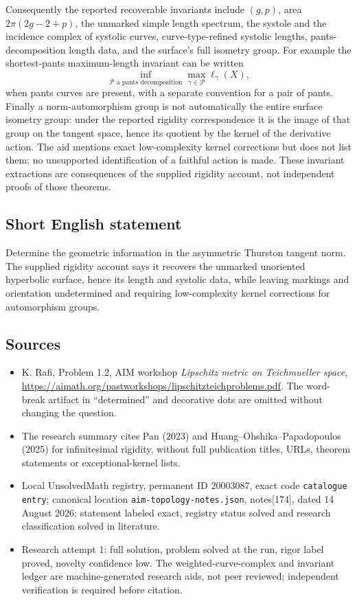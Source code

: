 \documentclass[11pt]{article}
\begin{document}
Consequently the reported recoverable invariants include \((g,p)\), area \(2\pi(2g-2+p)\), the unmarked simple length spectrum, the systole and the incidence complex of systolic curves, curve-type-refined systolic lengths, pants-decomposition length data, and the surface's full isometry group. For example the shortest-pants maximum-length invariant can be written
\[
\inf_{\mathcal P\text{ a pants decomposition}}\max_{\gamma\in\mathcal P}\ell_\gamma(X),
\]
when pants curves are present, with a separate convention for a pair of pants. Finally a norm-automorphism group is not automatically the entire surface isometry group: under the reported rigidity correspondence it is the image of that group on the tangent space, hence its quotient by the kernel of the derivative action. The aid mentions exact low-complexity kernel corrections but does not list them; no unsupported identification of a faithful action is made. These invariant extractions are consequences of the supplied rigidity account, not independent proofs of those theorems.
\subsection{Short English statement}
Determine the geometric information in the asymmetric Thurston tangent norm. The supplied rigidity account says it recovers the unmarked unoriented hyperbolic surface, hence its length and systolic data, while leaving markings and orientation undetermined and requiring low-complexity kernel corrections for automorphism groups.
\subsection{Sources}
\begin{itemize}
\item K. Rafi, Problem 1.2, AIM workshop \emph{Lipschitz metric on Teichmueller space}, \url{https://aimath.org/pastworkshops/lipschitzteichproblems.pdf}. The word-break artifact in ``determined'' and decorative dots are omitted without changing the question.
\item The research summary cites Pan (2023) and Huang--Ohshika--Papadopoulos (2025) for infinitesimal rigidity, without full publication titles, URLs, theorem statements or exceptional-kernel lists.
\item Local UnsolvedMath registry, permanent ID 20003087, exact code \texttt{catalogue entry}; canonical location \texttt{aim-topology-notes.json}, notes[174], dated 14 August 2026; statement labeled exact, registry status solved and research classification solved in literature.
\item Research attempt 1: full solution, problem solved at the run, rigor label proved, novelty confidence low. The weighted-curve-complex and invariant ledger are machine-generated research aids, not peer reviewed; independent verification is required before citation.
\end{itemize}
\end{document}
